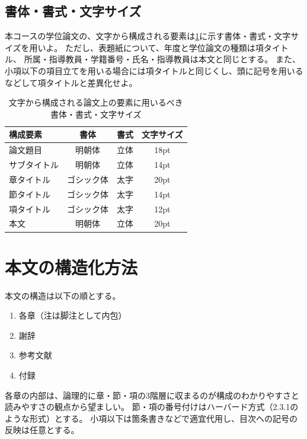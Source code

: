 		\subsection{書体・書式・文字サイズ}
			\label{sub:font}

			本コースの学位論文の、文字から構成される要素は\cref{tab:font}に示す書体・書式・文字サイズを用いよ。
			ただし、表題紙について、年度と学位論文の種類は項タイトル、
			所属・指導教員・学籍番号・氏名・指導教員は本文と同じとする。
			また、小項以下の項目立てを用いる場合には項タイトルと同じくし、頭に記号を用いるなどして項タイトルと差異化せよ。

			\begin{table}[tb]
				\caption{文字から構成される論文上の要素に用いるべき書体・書式・文字サイズ}
				\label{tab:font}
				\centering

				\begin{tabular}{lccc}
				\toprule
				\textbf{構成要素} & \textbf{書体} & \textbf{書式} & \textbf{文字サイズ}\\
				\midrule
					論文題目 & 明朝体 & 立体 & 18pt \\
					サブタイトル & 明朝体 & 立体 & 14pt \\
					章タイトル & ゴシック体 & 太字 & 20pt \\
					節タイトル & ゴシック体 & 太字 & 14pt \\
					項タイトル & ゴシック体 & 太字 & 12pt \\
					本文 & 明朝体 & 立体 & 20pt \\
				\bottomrule
				\end{tabular}
			\end{table}

	\section{本文の構造化方法}
		\label{sec:structure}

		本文の構造は以下の順とする。

		\begin{enumerate}
			\item 各章（注は脚注として内包）
			\item 謝辞
			\item 参考文献
			\item 付録
		\end{enumerate}

		各章の内部は、論理的に章・節・項の3階層に収まるのが構成のわかりやすさと読みやすさの観点から望ましい。
		節・項の番号付けはハーバード方式（2.3.1のような形式）とする。
		小項以下は箇条書きなどで適宜代用し、目次への記号の反映は任意とする。

